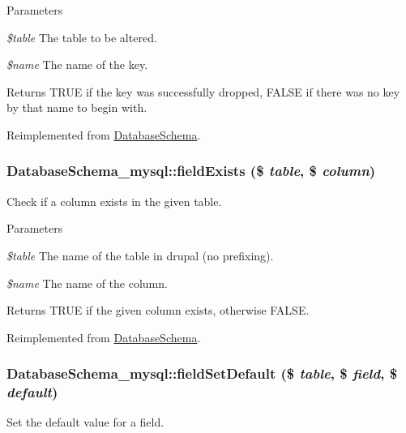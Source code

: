 \begin{DoxyParams}{Parameters}
\item[{\em \$table}]The table to be altered. \item[{\em \$name}]The name of the key.\end{DoxyParams}
\begin{DoxyReturn}{Returns}
TRUE if the key was successfully dropped, FALSE if there was no key by that name to begin with. 
\end{DoxyReturn}


Reimplemented from \hyperlink{classDatabaseSchema_a40519a35f27d1bfe0f2eb0e759df1afd}{DatabaseSchema}.\hypertarget{classDatabaseSchema__mysql_a3f375da9ca1d0e8c7000820366457256}{
\subsubsection[{fieldExists}]{\setlength{\rightskip}{0pt plus 5cm}DatabaseSchema\_\-mysql::fieldExists (\$ {\em table}, \/  \$ {\em column})}}
\label{classDatabaseSchema__mysql_a3f375da9ca1d0e8c7000820366457256}
Check if a column exists in the given table.


\begin{DoxyParams}{Parameters}
\item[{\em \$table}]The name of the table in drupal (no prefixing). \item[{\em \$name}]The name of the column.\end{DoxyParams}
\begin{DoxyReturn}{Returns}
TRUE if the given column exists, otherwise FALSE. 
\end{DoxyReturn}


Reimplemented from \hyperlink{classDatabaseSchema_a1f657a73ea94b4fa0de1d1954350b4e7}{DatabaseSchema}.\hypertarget{classDatabaseSchema__mysql_ae88383059811a3c3328455ef04aea15a}{
\subsubsection[{fieldSetDefault}]{\setlength{\rightskip}{0pt plus 5cm}DatabaseSchema\_\-mysql::fieldSetDefault (\$ {\em table}, \/  \$ {\em field}, \/  \$ {\em default})}}
\label{classDatabaseSchema__mysql_ae88383059811a3c3328455ef04aea15a}
Set the default value for a field.


